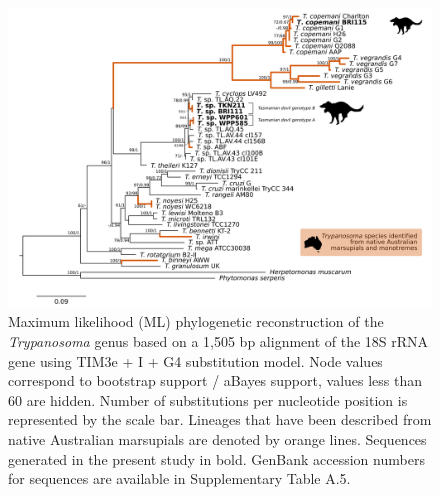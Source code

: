 \documentclass[a4paper, nobind]{templates/ociamthesis}
\begin{document}
\begin{figure}
\includegraphics[width=0.95\linewidth]{figures/ms-figs/Ch6-Fig2} \caption[Phylogenetic tree (\textit{18S rRNA}) of \textit{Trypanosoma} spp. from the Tasmanian devil.]{Maximum likelihood (ML) phylogenetic reconstruction of the \textit{Trypanosoma} genus based on a 1,505 bp alignment of the 18S rRNA gene using TIM3e + I + G4 substitution model. Node values correspond to bootstrap support / aBayes support, values less than 60 are hidden. Number of substitutions per nucleotide position is represented by the scale bar. Lineages that have been described from native Australian marsupials are denoted by orange lines. Sequences generated in the present study in bold. GenBank accession numbers for sequences are available in Supplementary Table A.5.}\label{fig:F62}
\end{figure}
\end{document}
